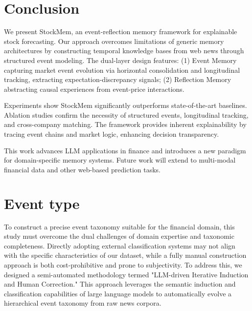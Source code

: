 \documentclass[sigconf, nonacm]{acmart} %
\begin{document}
\section{Conclusion}

We present StockMem, an event-reflection memory framework for explainable stock forecasting. Our approach overcomes limitations of generic memory architectures by constructing temporal knowledge bases from web news through structured event modeling. The dual-layer design features: (1) Event Memory capturing market event evolution via horizontal consolidation and longitudinal tracking, extracting expectation-discrepancy signals; (2) Reflection Memory abstracting causal experiences from event-price interactions.

Experiments show StockMem significantly outperforms state-of-the-art baselines. Ablation studies confirm the necessity of structured events, longitudinal tracking, and cross-company matching. The framework provides inherent explainability by tracing event chains and market logic, enhancing decision transparency.

This work advances LLM applications in finance and introduces a new paradigm for domain-specific memory systems. Future work will extend to multi-modal financial data and other web-based prediction tasks.








%



\appendix

\section{Event type}
To construct a precise event taxonomy suitable for the financial domain, this study must overcome the dual challenges of domain expertise and taxonomic completeness. Directly adopting external classification systems may not align with the specific characteristics of our dataset, while a fully manual construction approach is both cost-prohibitive and prone to subjectivity. To address this, we designed a semi-automated methodology termed "LLM-driven Iterative Induction and Human Correction." This approach leverages the semantic induction and classification capabilities of large language models to automatically evolve a hierarchical event taxonomy from raw news corpora.
\end{document}
